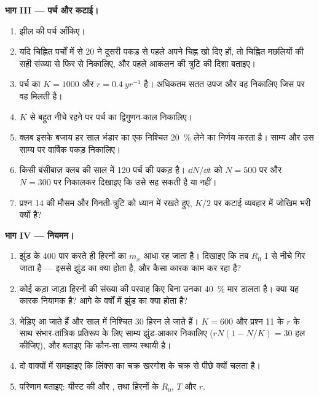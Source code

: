 \begin{problem}
\medskip
\noindent\textbf{भाग III --- पर्च और कटाई।}
\begin{enumerate}[resume]
  \item झील की पर्च  आँकिए।
  \item यदि चिह्नित पर्चों में से 20 ने दूसरी पकड़ से पहले अपने चिह्न
        खो दिए हों, तो चिह्नित मछलियों की सही संख्या से फिर से निकालिए,
        और पहले आकलन की त्रुटि की दिशा बताइए।
  \item पर्च  का $K = 1000$ और $r = \qty{0.4}{yr^{-1}}$ है।
        अधिकतम सतत उपज और वह  निकालिए जिस पर वह मिलती है।
  \item $K$ से बहुत नीचे रहने पर पर्च  का द्विगुणन-काल निकालिए।
  \item क्लब इसके बजाय हर साल भंडार का एक निश्चित \qty{20}{\%} लेने का
        निर्णय करता है। साम्य  और उस साम्य पर वार्षिक पकड़
        निकालिए।
  \item किसी बंसीबाज़ क्लब की साल में 120 पर्च की पकड़ है। $\dd N/\dd t$
        को $N =
        500$ पर और $N = 300$ पर निकालकर दिखाइए कि  उसे सह सकती है
        या नहीं।
  \item प्रश्न 14 की मौसम और गिनती-त्रुटि को ध्यान में रखते हुए,
        $K/2$ पर कटाई व्यवहार में जोखिम भरी क्यों है?
\end{enumerate}

\medskip
\noindent\textbf{भाग IV --- नियमन।}
\begin{enumerate}[resume]
  \item झुंड के 400 पार करते ही हिरनों का $m_x$ आधा रह जाता है।
        दिखाइए कि तब $R_0$ 1 से नीचे गिर जाता है --- इससे झुंड का क्या
        होता है, और कैसा कारक काम कर रहा है?
  \item कोई कड़ा जाड़ा हिरनों की संख्या की परवाह किए बिना उनका
        \qty{40}{\%} मार डालता है। क्या यह कारक नियामक है? आगे के
        वर्षों में झुंड का क्या होता है?
  \item भेड़िए आ जाते हैं और साल में निश्चित 30 हिरन ले जाते हैं।
        $K = 600$ और प्रश्न 11 के $r$ के साथ संभार-तांत्रिक प्रतिरूप के
        लिए साम्य झुंड-आकार निकालिए ($rN(1 - N/K) = 30$ हल कीजिए), और
        बताइए कि कौन-सा साम्य स्थायी है।
  \item दो वाक्यों में समझाइए कि लिंक्स का चक्र खरगोश के चक्र से पीछे
        क्यों चलता है।
  \item परिणाम बताइए: यीस्ट की  और , तथा
        हिरनों के $R_0$, $T$ और $r$.
\end{enumerate}
\end{problem}
